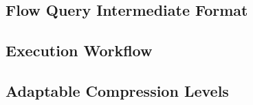 \subsection{Flow Query Intermediate Format}


\subsection{Execution Workflow}


\subsection{Adaptable Compression Levels}

